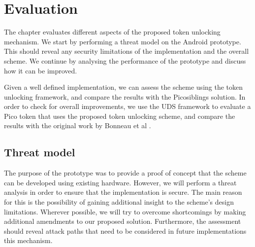 
\chapter{Evaluation} %

\label{Chapter6} %


The chapter evaluates different aspects of the proposed token unlocking mechanism. We start by performing a threat model on the Android prototype. This should reveal any security limitations of the implementation and the overall scheme. We continue by analysing the performance of the prototype and discuss how it can be improved.

Given a well defined implementation, we can assess the scheme using the token unlocking framework, and compare the results with the Picosiblings solution. In order to check for overall improvements, we use the UDS framework to evaluate a Pico token that uses the proposed token unlocking scheme, and compare the results with the original work by Bonneau et al \cite{bonneau2012quest}.

\section{Threat model}

The purpose of the prototype was to provide a proof of concept that the scheme can be developed using existing hardware. However, we will perform a threat analysis in order to ensure that the implementation is secure. The main reason for this is the possibility of gaining additional insight to the scheme's design limitations. Wherever possible, we will try to overcome shortcomings by making additional amendments to our proposed solution. Furthermore, the assessment should reveal attack paths that need to be considered in future implementations this mechanism.

